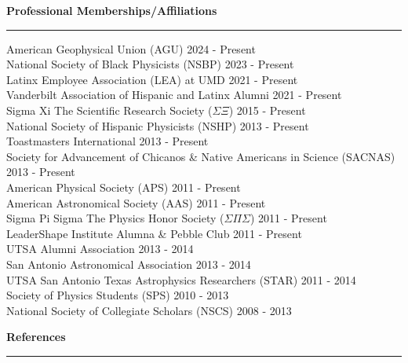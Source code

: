 \documentclass[12pt]{article}
\begin{document}
\newpage
\noindent
{\bf Professional Memberships/Affiliations} \\
\vspace{-10mm}
\begin{center}
\rule{\textwidth}{0.2mm}
\end{center}
\vspace{-3mm}
{ 

\small 
\noindent 
American Geophysical Union (AGU) \hfill 2024 - Present \\
National Society of Black Physicists (NSBP) \hfill 2023 - Present \\
Latinx Employee Association (LEA) at UMD \hfill 2021 - Present \\
Vanderbilt Association of Hispanic and Latinx Alumni \hfill 2021 - Present \\
Sigma Xi \text{\textbar} The Scientific Research Society ($\Sigma \Xi$) \hfill 2015 - Present \\
National Society of Hispanic Physicists (NSHP) \hfill 2013 - Present \\
Toastmasters International \hfill 2013 - Present \\
Society for Advancement of Chicanos \& Native Americans in Science (SACNAS) \hfill 2013 - Present  \\
American Physical Society (APS) \hfill 2011 - Present \\
American Astronomical Society (AAS) \hfill 2011 - Present \\
Sigma Pi Sigma \text{\textbar} The Physics Honor Society ($\Sigma \Pi \Sigma$) \hfill 2011 - Present \\
LeaderShape Institute Alumna \& Pebble Club \hfill 2011 - Present \\
UTSA Alumni Association \hfill 2013 - 2014 \\
San Antonio Astronomical Association \hfill 2013 - 2014 \\
UTSA San Antonio Texas Astrophysics Researchers (STAR) \hfill 2011 - 2014 \\
Society of Physics Students (SPS) \hfill 2010 - 2013 \\
National Society of Collegiate Scholars (NSCS) \hfill 2008 - 2013 \\
}

\newpage
\noindent
{\bf References} \\
\vspace{-10mm}
\begin{center}
\rule{\textwidth}{0.2mm}
\end{center}
\vspace{-3mm}
\end{document}
